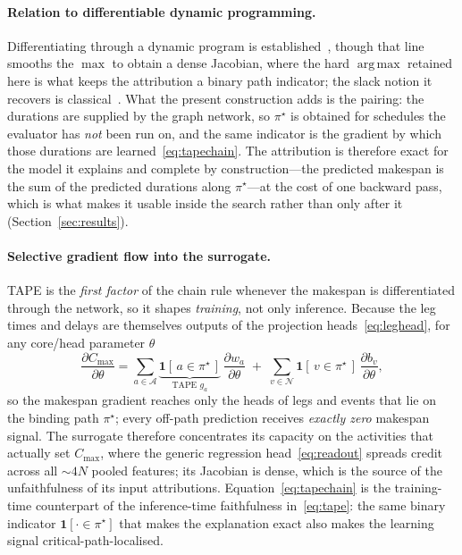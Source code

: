 \documentclass[11pt]{article}
\newcommand{\Cmax}{C_{\max}}
\newcommand{\argmax}{\operatorname*{arg\,max}}
\begin{document}
\paragraph{Relation to differentiable dynamic programming.} Differentiating through a
dynamic program is established~\cite{mensch2018ddp,rush2020torchstruct}, though that line
smooths the $\max$ to obtain a dense Jacobian, where the hard $\argmax$ retained here is
what keeps the attribution a binary path indicator; the slack notion it recovers is
classical~\cite{kelley1959cpm}. What the present construction adds is the pairing: the
durations are supplied by the graph network, so $\pi^\star$ is obtained for schedules the
evaluator has \emph{not} been run on, and the same indicator is the gradient by which those
durations are learned~\eqref{eq:tapechain}. The attribution is therefore exact for the
model it explains and complete by construction---the predicted makespan is the sum of the
predicted durations along $\pi^\star$---at the cost of one backward pass, which is what
makes it usable inside the search rather than only after it
(Section~\ref{sec:results}).

\paragraph{Selective gradient flow into the surrogate.} TAPE is the \emph{first factor} of
the chain rule whenever the makespan is differentiated through the network, so it shapes
\emph{training}, not only inference. Because the leg times and delays are themselves outputs
of the projection heads~\eqref{eq:leghead}, for any core/head parameter $\theta$
\begin{equation}
\frac{\partial \Cmax}{\partial \theta}
=\sum_{a\in\mathcal A}\underbrace{\mathbf 1[\,a\in\pi^\star\,]}_{\text{TAPE }g_a}\,
   \frac{\partial w_a}{\partial \theta}
\;+\;\sum_{v\in\mathcal N}\mathbf 1[\,v\in\pi^\star\,]\,
   \frac{\partial b_v}{\partial \theta},
\label{eq:tapechain}
\end{equation}
so the makespan gradient reaches only the heads of legs and events that lie on the
binding path $\pi^\star$; every off-path prediction receives \emph{exactly zero} makespan
signal. The surrogate therefore concentrates its capacity on the activities that actually
set $\Cmax$, where the generic regression head~\eqref{eq:readout} spreads credit across all
$\sim\!4N$ pooled features; its Jacobian is dense, which is the source of the unfaithfulness
of its input attributions. Equation~\eqref{eq:tapechain} is the training-time
counterpart of the inference-time faithfulness in~\eqref{eq:tape}: the same binary indicator
$\mathbf 1[\cdot\in\pi^\star]$ that makes the explanation exact also makes the learning
signal critical-path-localised.
\end{document}

